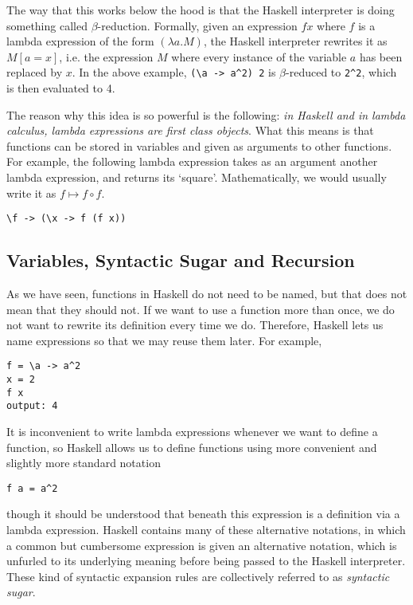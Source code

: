 \documentclass[11pt]{article}
\theoremstyle{nonumberplain}
\begin{document}
The way that this works below the hood is that the Haskell interpreter is doing something called $\beta$-reduction. Formally, given an expression $f x$ where $f$ is a lambda expression of the form $(\lambda a. M)$, the Haskell interpreter rewrites it as $M[a=x]$, i.e. the expression $M$ where every instance of the variable $a$ has been replaced by $x$. In the above example, \lstinline|(\a -> a^2) 2| is $\beta$-reduced to \lstinline|2^2|, which is then evaluated to 4.

The reason why this idea is so powerful is the following: \emph{in Haskell and in lambda calculus, lambda expressions are first class objects}. What this means is that functions can be stored in variables and given as arguments to other functions. For example, the following lambda expression takes as an argument another lambda expression, and returns its `square'. Mathematically, we would usually write it as $f \mapsto f \circ f$.
\begin{lstlisting}
\f -> (\x -> f (f x))
\end{lstlisting}

\subsection{Variables, Syntactic Sugar and Recursion}

As we have seen, functions in Haskell do not need to be named, but that does not mean that they should not. If we want to use a function more than once, we do not want to rewrite its definition every time we do. Therefore, Haskell lets us name expressions so that we may reuse them later. For example,
\begin{lstlisting}
f = \a -> a^2
x = 2
f x
output: 4
\end{lstlisting}

It is inconvenient to write lambda expressions whenever we want to define a function, so Haskell allows us to define functions using more convenient and slightly more standard notation
\begin{lstlisting}
f a = a^2
\end{lstlisting}
though it should be understood that beneath this expression is a definition via a lambda expression. Haskell contains many of these alternative notations, in which a common but cumbersome expression is given an alternative notation, which is unfurled to its underlying meaning before being passed to the Haskell interpreter. These kind of syntactic expansion rules are collectively referred to as \emph{syntactic sugar}.
\end{document}
